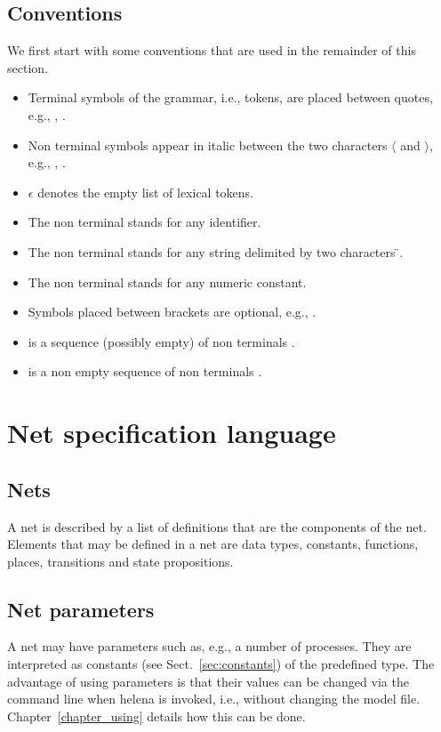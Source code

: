 \subsection{Conventions}
We first start with some conventions that are used in the remainder of
this section.
\begin{itemize}
\item Terminal symbols of the grammar, i.e., tokens, are placed
between quotes, e.g., , .
\item Non terminal symbols appear in italic between the two characters
$\langle$ and $\rangle$, e.g., ,
.
\item $\epsilon$ denotes the empty list of lexical tokens.
\item The non terminal  stands for any identifier.
\item The non terminal  stands for any string
  delimited by two characters \"{}.
\item The non terminal  stands for any numeric constant.
\item Symbols placed between brackets are optional, e.g.,
.
\item {} is a sequence (possibly empty) of
non terminals .
\item {} is a non empty sequence of non
terminals .
\end{itemize}



\section{Net specification language}


\subsection{Nets}
A net is described by a list of definitions that are the components of
the net.  Elements that may be defined in a net are data types,
constants, functions, places, transitions and state propositions.\\

\netdef


\subsection{Net parameters}
A net may have parameters such as, e.g., a number of processes.  They
are interpreted as constants (see Sect.~\ref{sec:constants}) of the
predefined  type.  The advantage of using parameters is that
their values can be changed via the command line when helena is
invoked, i.e., without changing the model file.
Chapter~\ref{chapter_using} details how this can be done.

